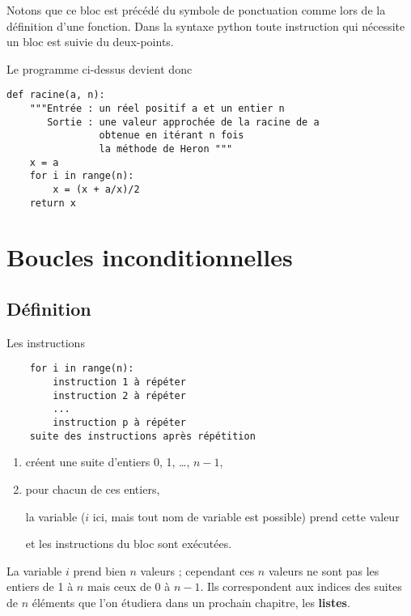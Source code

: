 Notons que ce bloc est précédé du symbole de ponctuation \type{:} comme lors de la définition d'une fonction. Dans la syntaxe python toute instruction qui nécessite un bloc est suivie du deux-points.

\newpage

Le programme ci-dessus devient donc
\begin{lstlisting}
def racine(a, n):
    """Entrée : un réel positif a et un entier n
       Sortie : une valeur approchée de la racine de a
                obtenue en itérant n fois 
                la méthode de Heron """
    x = a
    for i in range(n):
        x = (x + a/x)/2
    return x
\end{lstlisting}
\section{Boucles inconditionnelles}
\subsection{Définition}
\begin{defin}
Les instructions 

{\normalfont
\begin{lstlisting}
    for i in range(n):
        instruction 1 à répéter
        instruction 2 à répéter
        ...
        instruction p à répéter
    suite des instructions après répétition
\end{lstlisting}
}
\begin{enumerate}
  \item créent une suite d'entiers 0, 1, \ldots, $n-1$,
  \item pour chacun de ces entiers, 
  
  la variable ($i$ ici, mais tout nom de variable est possible) prend cette valeur

et les instructions du bloc sont exécutées.
\end{enumerate}
\end{defin}
La variable $i$ prend bien $n$ valeurs ; cependant ces $n$ valeurs ne sont pas les entiers de 1 à $n$ mais ceux de 0 à $n-1$. Ils correspondent aux indices des suites de $n$ éléments que l'on étudiera dans un prochain chapitre, les {\bf listes}.

